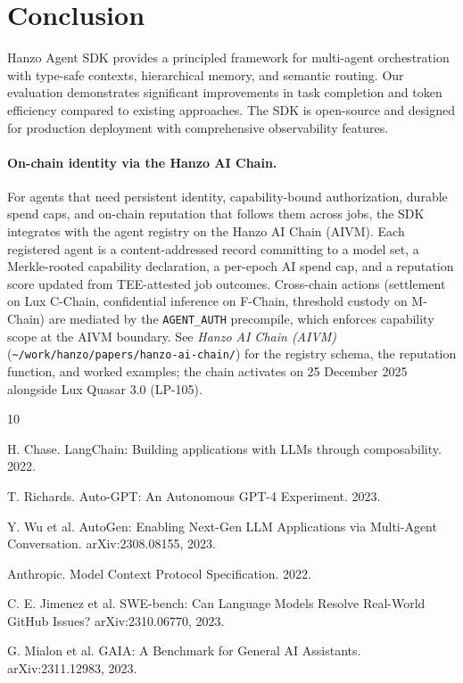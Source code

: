 \section{Conclusion}


Hanzo Agent SDK provides a principled framework for multi-agent orchestration with type-safe contexts, hierarchical memory, and semantic routing. Our evaluation demonstrates significant improvements in task completion and token efficiency compared to existing approaches. The SDK is open-source and designed for production deployment with comprehensive observability features.

\paragraph{On-chain identity via the Hanzo AI Chain.}
For agents that need persistent identity, capability-bound authorization, durable spend caps, and on-chain reputation that follows them across jobs, the SDK integrates with the agent registry on the Hanzo AI Chain (AIVM). Each registered agent is a content-addressed record committing to a model set, a Merkle-rooted capability declaration, a per-epoch AI spend cap, and a reputation score updated from TEE-attested job outcomes. Cross-chain actions (settlement on Lux C-Chain, confidential inference on F-Chain, threshold custody on M-Chain) are mediated by the \texttt{AGENT\_AUTH} precompile, which enforces capability scope at the AIVM boundary. See \emph{Hanzo AI Chain (AIVM)} (\texttt{\textasciitilde/work/hanzo/papers/hanzo-ai-chain/}) for the registry schema, the reputation function, and worked examples; the chain activates on 25 December 2025 alongside Lux Quasar 3.0 (LP-105).


\begin{thebibliography}{10}

H. Chase. LangChain: Building applications with LLMs through composability. 2022.

T. Richards. Auto-GPT: An Autonomous GPT-4 Experiment. 2023.

Y. Wu et al. AutoGen: Enabling Next-Gen LLM Applications via Multi-Agent Conversation. arXiv:2308.08155, 2023.

Anthropic. Model Context Protocol Specification. 2022.

C. E. Jimenez et al. SWE-bench: Can Language Models Resolve Real-World GitHub Issues? arXiv:2310.06770, 2023.

G. Mialon et al. GAIA: A Benchmark for General AI Assistants. arXiv:2311.12983, 2023.

\end{thebibliography}

